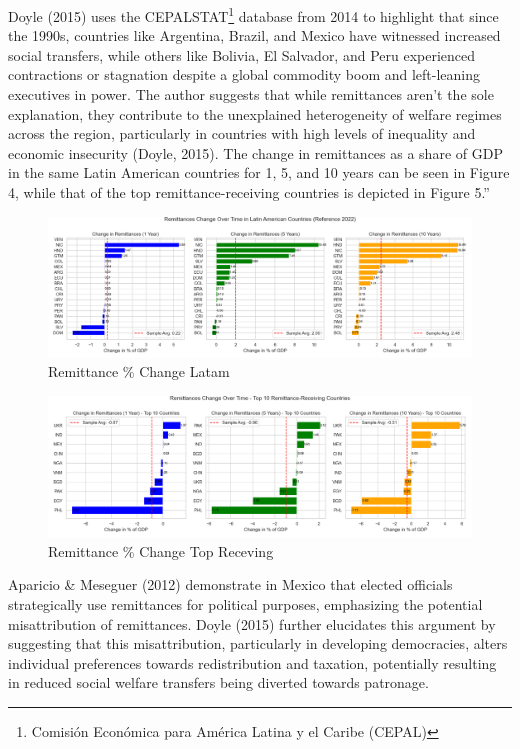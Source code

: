 \documentclass[
]{article}
\begin{document}
Doyle (2015) uses the CEPALSTAT\footnote{Comisión Económica para América
  Latina y el Caribe (CEPAL)} database from 2014 to highlight that since
the 1990s, countries like Argentina, Brazil, and Mexico have witnessed
increased social transfers, while others like Bolivia, El Salvador, and
Peru experienced contractions or stagnation despite a global commodity
boom and left-leaning executives in power. The author suggests that
while remittances aren't the sole explanation, they contribute to the
unexplained heterogeneity of welfare regimes across the region,
particularly in countries with high levels of inequality and economic
insecurity (Doyle, 2015). The change in remittances as a share of GDP in
the same Latin American countries for 1, 5, and 10 years can be seen in
Figure 4, while that of the top remittance-receiving countries is
depicted in Figure 5.''

\begin{figure}
\hypertarget{fig:label}{%
\centering
\includegraphics[width=1\textwidth,height=1\textheight]{remlat_chg.png}
\caption{Remittance \% Change Latam}\label{fig:label}
}
\end{figure}

\begin{figure}
\hypertarget{fig:label}{%
\centering
\includegraphics[width=1\textwidth,height=1\textheight]{remtop_chg.png}
\caption{Remittance \% Change Top Receving}\label{fig:label}
}
\end{figure}

Aparicio \& Meseguer (2012) demonstrate in Mexico that elected officials
strategically use remittances for political purposes, emphasizing the
potential misattribution of remittances. Doyle (2015) further elucidates
this argument by suggesting that this misattribution, particularly in
developing democracies, alters individual preferences towards
redistribution and taxation, potentially resulting in reduced social
welfare transfers being diverted towards patronage.
\end{document}
